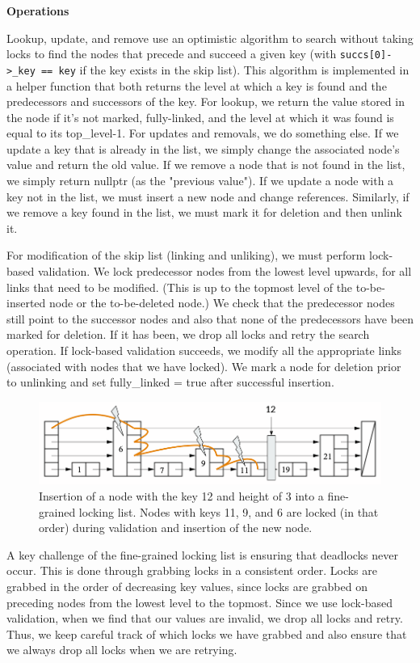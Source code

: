 \documentclass[11pt]{article}
\begin{document}
\textbf{Operations}

Lookup, update, and remove use an optimistic algorithm to search without taking locks to find the nodes that precede and succeed a given key (with \texttt{succs[0]->\_key == key} if the key exists in the skip list). This algorithm is implemented in a helper function that both returns the level at which a key is found and the predecessors and successors of the key. For lookup, we return the value stored in the node if it's not marked, fully-linked, and the level at which it was found is equal to its top\_level-1. For updates and removals, we do something else. If we update a key that is already in the list, we simply change the associated node's value and return the old value. If we remove a node that is not found in the list, we simply return nullptr (as the "previous value"). If we update a node with a key not in the list, we must insert a new node and change references. Similarly, if we remove a key found in the list, we must mark it for deletion and then unlink it.

For modification of the skip list (linking and unliking), we must perform lock-based validation. We lock predecessor nodes from the lowest level upwards, for all links that need to be modified. (This is up to the topmost level of the to-be-inserted node or the to-be-deleted node.)  We check that the predecessor nodes still point to the successor nodes and also that none of the predecessors have been marked for deletion. If it has been, we drop all locks and retry the search operation. If lock-based validation succeeds, we modify all the appropriate links (associated with nodes that we have locked). We mark a node for deletion prior to unlinking and set fully\_linked = true after successful insertion.

\begin{figure}[h!]
  \includegraphics[width=5in]{skiplist_insertion.png}
  \caption{Insertion of a node with the key 12 and height of 3 into a fine-grained locking list. Nodes with keys 11, 9, and 6 are locked (in that order) during validation and insertion of the new node.}
\end{figure}
A key challenge of the fine-grained locking list is ensuring that deadlocks never occur. This is done through grabbing locks in a consistent order. Locks are grabbed in the order of decreasing key values, since locks are grabbed on preceding nodes from the lowest level to the topmost. Since we use lock-based validation, when we find that our values are invalid, we drop all locks and retry. Thus, we keep careful track of which locks we have grabbed and also ensure that we always drop all locks when we are retrying.
\end{document}
